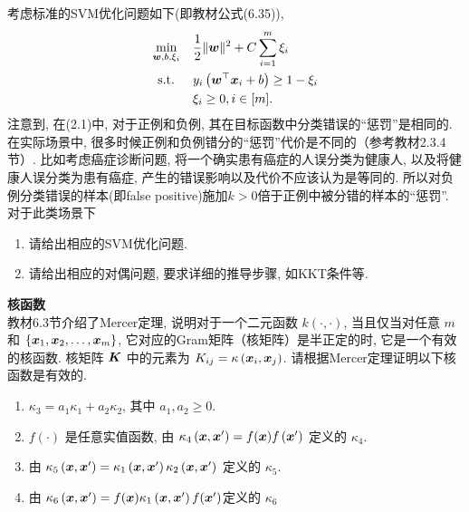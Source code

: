 \documentclass[answers]{exam}  %
\begin{document}
\begin{questions}
考虑标准的SVM优化问题如下(即教材公式(6.35)), 
\begin{equation}
    \begin{aligned}
\min _{\boldsymbol{w}, b, \xi_{i}} \quad & \frac{1}{2}\|\boldsymbol{w}\|^{2}+C \sum_{i=1}^{m} \xi_{i} \\
\text { s.t. } \quad & y_{i}\left(\boldsymbol{w}^\top {\boldsymbol{x}}_{i}+b\right) \geq 1-\xi_{i} \\
& \xi_{i} \geq 0, i\in [m] .
\end{aligned}
\end{equation}
注意到, 在(2.1)中, 对于正例和负例, 其在目标函数中分类错误的“惩罚”是相同的. 在实际场景中, 很多时候正例和负例错分的“惩罚”代价是不同的（参考教材2.3.4节）. 比如考虑癌症诊断问题, 将一个确实患有癌症的人误分类为健康人, 以及将健康人误分类为患有癌症, 产生的错误影响以及代价不应该认为是等同的. 所以对负例分类错误的样本(即false positive)施加$k>0$倍于正例中被分错的样本的“惩罚”. 对于此类场景下
\begin{enumerate}
    \item 请给出相应的SVM优化问题.
    \item 请给出相应的对偶问题, 要求详细的推导步骤, 如KKT条件等.
\end{enumerate}

	\begin{solution}
	\end{solution}
\question [20] \textbf{核函数} \\
教材6.3节介绍了Mercer定理, 说明对于一个二元函数 $k(\cdot, \cdot)$, 当且仅当对任意 $m$ 和 $\{{\boldsymbol{x}}_{1}, {\boldsymbol{x}}_{2}, \ldots, {\boldsymbol{x}}_{m}\}$, 它对应的Gram矩阵（核矩阵）是半正定的时, 它是一个有效的核函数. 核矩阵 $\boldsymbol{K}$ 中的元素为 $K_{i j}=\kappa\left({\boldsymbol{x}}_{i}, {\boldsymbol{x}}_{j}\right)$. 请根据Mercer定理证明以下核函数是有效的.

\begin{enumerate}
    \item $\kappa_{3}=a_{1} \kappa_{1}+a_{2} \kappa_{2}$, 其中 $a_{1}, a_{2} \geq 0$.
    \item $f(\cdot)$ 是任意实值函数, 由 $\kappa_{4}\left({\boldsymbol{x}}, {\boldsymbol{x}}^{\prime}\right)=f({\boldsymbol{x}}) f\left({\boldsymbol{x}}^{\prime}\right)$ 定义的 $\kappa_{4}$.
    \item 由 $\kappa_{5}\left({\boldsymbol{x}}, {\boldsymbol{x}}^{\prime}\right)=\kappa_{1}\left({\boldsymbol{x}}, {\boldsymbol{x}}^{\prime}\right) \kappa_{2}\left({\boldsymbol{x}}, {\boldsymbol{x}}^{\prime}\right)$ 定义的 $\kappa_{5}$.
    \item 由 $\kappa_{6}\left({\boldsymbol{x}}, {\boldsymbol{x}}^{\prime}\right)=f({\boldsymbol{x}}) \kappa_{1}\left({\boldsymbol{x}}, {\boldsymbol{x}}^{\prime}\right)f({\boldsymbol{x}}')$定义的 $\kappa_{6}$
\end{enumerate}
	\begin{solution}
	\end{solution}


\end{questions}
\end{document}
